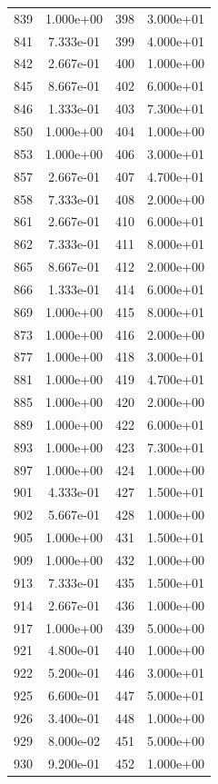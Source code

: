 \documentclass[12pt]{article}
\begin{document}
\begin{longtable}{@{}cccc@{}}
839 & 1.000e+00 & 398 & 3.000e+01 \\
841 & 7.333e-01 & 399 & 4.000e+01 \\
842 & 2.667e-01 & 400 & 1.000e+00 \\
845 & 8.667e-01 & 402 & 6.000e+01 \\
846 & 1.333e-01 & 403 & 7.300e+01 \\
850 & 1.000e+00 & 404 & 1.000e+00 \\
853 & 1.000e+00 & 406 & 3.000e+01 \\
857 & 2.667e-01 & 407 & 4.700e+01 \\
858 & 7.333e-01 & 408 & 2.000e+00 \\
861 & 2.667e-01 & 410 & 6.000e+01 \\
862 & 7.333e-01 & 411 & 8.000e+01 \\
865 & 8.667e-01 & 412 & 2.000e+00 \\
866 & 1.333e-01 & 414 & 6.000e+01 \\
869 & 1.000e+00 & 415 & 8.000e+01 \\
873 & 1.000e+00 & 416 & 2.000e+00 \\
877 & 1.000e+00 & 418 & 3.000e+01 \\
881 & 1.000e+00 & 419 & 4.700e+01 \\
885 & 1.000e+00 & 420 & 2.000e+00 \\
889 & 1.000e+00 & 422 & 6.000e+01 \\
893 & 1.000e+00 & 423 & 7.300e+01 \\
897 & 1.000e+00 & 424 & 1.000e+00 \\
901 & 4.333e-01 & 427 & 1.500e+01 \\
902 & 5.667e-01 & 428 & 1.000e+00 \\
905 & 1.000e+00 & 431 & 1.500e+01 \\
909 & 1.000e+00 & 432 & 1.000e+00 \\
913 & 7.333e-01 & 435 & 1.500e+01 \\
914 & 2.667e-01 & 436 & 1.000e+00 \\
917 & 1.000e+00 & 439 & 5.000e+00 \\
921 & 4.800e-01 & 440 & 1.000e+00 \\
922 & 5.200e-01 & 446 & 3.000e+01 \\
925 & 6.600e-01 & 447 & 5.000e+01 \\
926 & 3.400e-01 & 448 & 1.000e+00 \\
929 & 8.000e-02 & 451 & 5.000e+00 \\
930 & 9.200e-01 & 452 & 1.000e+00 \\

\end{longtable}
\end{document}
